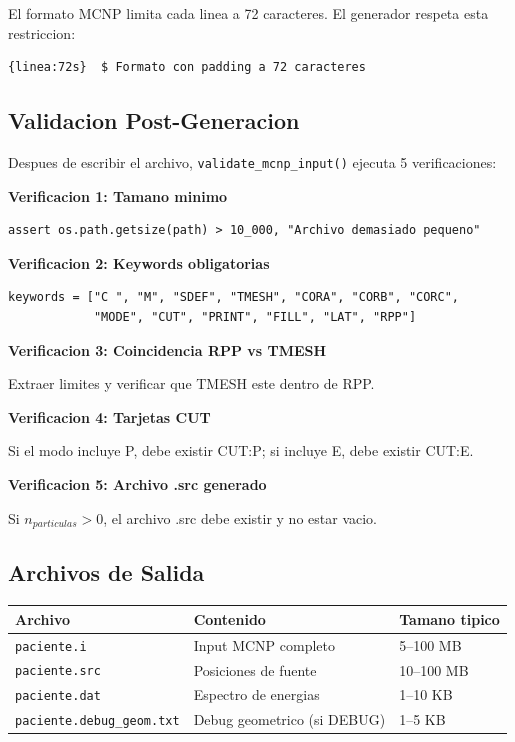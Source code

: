 \documentclass[12pt,a4paper]{article}
\begin{document}
El formato MCNP limita cada linea a 72 caracteres. El generador respeta esta restriccion:

\begin{verbatim}
{linea:72s}  $ Formato con padding a 72 caracteres
\end{verbatim}

\subsection{Validacion Post-Generacion}

Despues de escribir el archivo, \texttt{validate\_mcnp\_input()} ejecuta 5 verificaciones:

\textbf{Verificacion 1: Tamano minimo}

\begin{verbatim}
assert os.path.getsize(path) > 10_000, "Archivo demasiado pequeno"
\end{verbatim}

\textbf{Verificacion 2: Keywords obligatorias}

\begin{verbatim}
keywords = ["C ", "M", "SDEF", "TMESH", "CORA", "CORB", "CORC",
            "MODE", "CUT", "PRINT", "FILL", "LAT", "RPP"]
\end{verbatim}

\textbf{Verificacion 3: Coincidencia RPP vs TMESH}

Extraer limites y verificar que TMESH este dentro de RPP.

\textbf{Verificacion 4: Tarjetas CUT}

Si el modo incluye P, debe existir CUT:P; si incluye E, debe existir CUT:E.

\textbf{Verificacion 5: Archivo .src generado}

Si $n_{particulas} > 0$, el archivo .src debe existir y no estar vacio.

\subsection{Archivos de Salida}

\begin{center}
\begin{tabular}{lll}
\toprule
\textbf{Archivo} & \textbf{Contenido} & \textbf{Tamano tipico} \\
\midrule
\texttt{paciente.i} & Input MCNP completo & 5--100 MB \\
\texttt{paciente.src} & Posiciones de fuente & 10--100 MB \\
\texttt{paciente.dat} & Espectro de energias & 1--10 KB \\
\texttt{paciente.debug\_geom.txt} & Debug geometrico (si DEBUG) & 1--5 KB \\
\bottomrule
\end{tabular}
\end{center}
\end{document}
